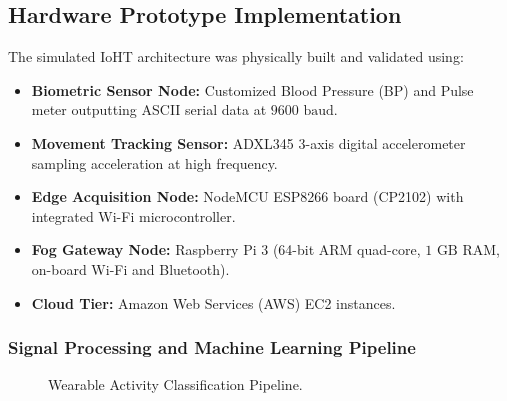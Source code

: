 \subsection{Hardware Prototype Implementation}
The simulated IoHT architecture was physically built and validated using:
\begin{itemize}[leftmargin=*]
  \item \textbf{Biometric Sensor Node:} Customized Blood Pressure (BP) and Pulse meter outputting ASCII serial data at $9600\text{ baud}$.
  \item \textbf{Movement Tracking Sensor:} ADXL345 3-axis digital accelerometer sampling acceleration at high frequency.
  \item \textbf{Edge Acquisition Node:} NodeMCU ESP8266 board (CP2102) with integrated Wi-Fi microcontroller.
  \item \textbf{Fog Gateway Node:} Raspberry Pi 3 (64-bit ARM quad-core, $1\text{ GB}$ RAM, on-board Wi-Fi and Bluetooth).
  \item \textbf{Cloud Tier:} Amazon Web Services (AWS) EC2 instances.
\end{itemize}

\subsubsection{Signal Processing and Machine Learning Pipeline}
\begin{figure}[H]
\centering
{}
\caption{Wearable Activity Classification Pipeline.}
\end{figure}

